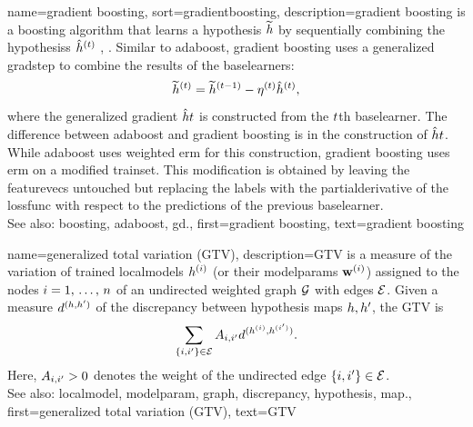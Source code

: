 {name={gradient boosting},
sort={gradientboosting},
 	description={\Gls{gradient} \gls{boosting} is a \gls{boosting} 
 		\gls{algorithm} that learns a \gls{hypothesis} $\widetilde{h}$ 
 		by sequentially combining the \glspl{hypothesis} $\hat{h}^{(t)}$ 
 		\cite[Algorithm 10.3]{hastie01statisticallearning}, \cite{Friedman2001}. 
 		Similar to \gls{adaboost}, \gls{gradient} \gls{boosting} uses a generalized \gls{gradstep} 
 		to combine the results of the \glspl{baselearner}:
        		$$\widetilde{h}^{(t)} = \widetilde{h}^{(t-1)}-\eta^{(t)} 
 		\hat{h}^{(t)},$$
 		where the generalized \gls{gradient} $\hat{h}{t}$ is constructed from 
		the $t$th \gls{baselearner}.
 		The difference between \gls{adaboost} and \gls{gradient} \gls{boosting} is in the construction 
		of $\hat{h}{t}$. While \gls{adaboost} uses weighted \gls{erm} for this construction, 
		\gls{gradient} \gls{boosting} uses \gls{erm} on a modified \gls{trainset}. This modification is obtained 
		by leaving the \glspl{featurevec} untouched but replacing the \glspl{label} with the 
		\gls{partialderivative} of the \gls{lossfunc} with respect to the \glspl{prediction} 
		of the previous \gls{baselearner}.   
 		 \\
 		See also: \gls{boosting}, \gls{adaboost}, \gls{gd}.},
 	first={gradient boosting}, 
 	text={gradient boosting}
}
	
{name={generalized total variation (GTV)}, 
	description={GTV is a 
		\gls{measure} of the variation of trained \glspl{localmodel} $h^{(i)}$ 
		(or their \glspl{modelparam} $\mathbf{w}^{(i)}$) assigned to the nodes $i=1, \,\ldots, \,n$ 
		of an undirected weighted \gls{graph} $\mathcal{G}$ with edges $\mathcal{E}$. Given a \gls{measure} $d^{(h,h')}$ 
		of the \gls{discrepancy} between \gls{hypothesis} \glspl{map} $h,h'$, the GTV is 
		\begin{equation} 
			\nonumber
			\sum_{\{i,i'\}\in \mathcal{E}} A_{i,i'} 
			d^{(h^{(i)},h^{(i')})}.
		\end{equation}
		Here, $A_{i,i'}>0$ denotes the weight of the undirected edge $\{i,i'\}\in \mathcal{E}$.
				\\
		See also: \gls{localmodel}, \gls{modelparam}, \gls{graph}, \gls{discrepancy}, \gls{hypothesis}, \gls{map}.},
	first={generalized total variation (GTV)},
	text={GTV} 
}
	
